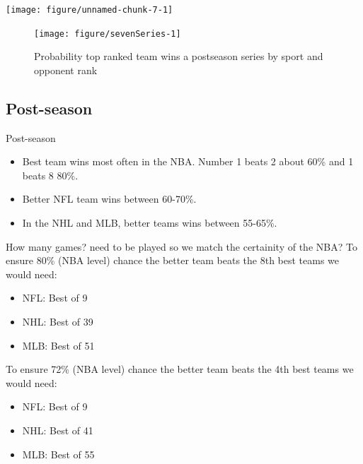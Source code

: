 \documentclass{beamer}\usepackage[]{graphicx}\usepackage[]{color}
\newenvironment{knitrout}{}{} %
\begin{document}
\begin{frame}[fragile]
\begin{knitrout}
\color{fgcolor}
\texttt{[image: figure/unnamed-chunk-7-1]} 

\end{knitrout}
\end{frame}

\begin{frame}[fragile]
\begin{knitrout}
\color{fgcolor}\begin{figure}
\texttt{[image: figure/sevenSeries-1]} \caption[Probability top ranked team wins a postseason series by sport and opponent rank]{Probability top ranked team wins a postseason series by sport and opponent rank}\label{fig:sevenSeries}
\end{figure}


\end{knitrout}

\end{frame}

\subsection{Post-season}
\begin{frame}{Post-season}
\begin{itemize}
\item Best team wins most often in the NBA.  Number 1 beats 2 about 60\% and 1 beats 8 80\%. 
\item Better NFL team wins between 60-70\%. 
\item In the NHL and MLB, better teams wins between 55-65\%. 
\end{itemize}
\end{frame}


\begin{frame}{How many games? }
need to be played so we match the certainity of the NBA?  
To ensure 80\% (NBA level) chance the better team beats the 8th best teams we would need: 
\begin{itemize}
\item NFL: Best of 9
\item NHL: Best of 39
\item MLB: Best of 51
\end{itemize}

To ensure 72\%  (NBA level) chance the better team beats the 4th best teams we would need: 
\begin{itemize}
\item NFL: Best of 9
\item NHL: Best of 41
\item MLB: Best of 55
\end{itemize}
\end{frame}
\end{document}
